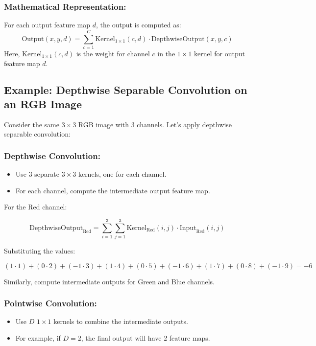 \begin{notechapter}
\subsubsection{Mathematical Representation:}
For each output feature map \(d\), the output is computed as:
\[
\text{Output}(x, y, d) = \sum_{c=1}^{C} \text{Kernel}_{1 \times 1}(c, d) 
\cdot \text{DepthwiseOutput}(x, y, c)
\]
Here, \(\text{Kernel}_{1 \times 1}(c, d)\) is the weight for channel 
\(c\) in the \(1 \times 1\) kernel for output feature map \(d\).

\subsection{Example: Depthwise Separable Convolution on an RGB Image}

Consider the same \(3 \times 3\) RGB image with 3 channels. Let's 
apply depthwise separable convolution:

\subsubsection{Depthwise Convolution:}
\begin{itemize}
    \item Use 3 separate \(3 \times 3\) kernels, one for each channel.
    \item For each channel, compute the intermediate output feature map.
\end{itemize}

For the Red channel:

\[
\text{DepthwiseOutput}_{\text{Red}} = \sum_{i=1}^{3} \sum_{j=1}^{3} 
\text{Kernel}_{\text{Red}}(i, j) \cdot \text{Input}_{\text{Red}}(i, j)
\]

Substituting the values:

\[
(1 \cdot 1) + (0 \cdot 2) + (-1 \cdot 3) + (1 \cdot 4) + (0 \cdot 5) 
+ (-1 \cdot 6) + (1 \cdot 7) + (0 \cdot 8) + (-1 \cdot 9) = -6
\]

Similarly, compute intermediate outputs for Green and Blue channels.

\subsubsection{Pointwise Convolution:}
\begin{itemize}
    \item Use \(D\) \(1 \times 1\) kernels to combine the intermediate outputs.
    \item For example, if \(D = 2\), the final output will have 2 feature maps.
\end{itemize}


\end{notechapter}
